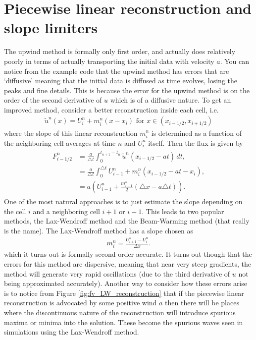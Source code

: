 \section*{Piecewise linear reconstruction and slope limiters}
The upwind method is formally only first order, and actually does relatively poorly in terms of actually transporting the initial data with velocity $a$.
You can notice from the example code that the upwind method has errors that are `diffusive' meaning that the initial data is diffused as time evolves, losing the peaks and fine details.
This is because the error for the upwind method is on the order of the second derivative of $u$ which is of a diffusive nature.
To get an improved method, consider a better reconstruction inside each cell, i.e.
\begin{gather}
\tilde{u}^n(x) = U_i^n + m_i^n(x-x_i) \mbox{ for } x \in (x_{i-1/2},x_{i+1/2})
\end{gather}
where the slope of this linear reconstruction $m_i^n$ is determined as a function of the neighboring cell averages at time $n$ and $U_i^n$ itself.
Then the flux is given by
\begin{align}
\begin{split}
F_{i-1/2}^n
&= \frac{a}{\triangle t}\int_{0}^{t_{n+1}-t_n} \tilde{u}^n(x_{i-1/2}-at)\, dt  ,\\
&= \frac{a}{\triangle t}\int_{0}^{\triangle t} U_{i-1}^n + m_i^n(x_{i-1/2} - at - x_i), \\
&= a \left( U_{i-1}^n + \frac{m_{i-1}^n}{2} (\triangle x - a \triangle t)\right).
\end{split}
\end{align}
One of the most natural approaches is to just estimate the slope depending on the cell $i$ and a neighboring cell $i+1$ or $i-1$.
This leads to two popular methods, the Lax-Wendroff method and the Beam-Warming method (that really is the name).
The Lax-Wendroff method has a slope chosen as
\begin{gather}
m_i^n = \frac{U^n_{i+1}-U_{i}^n}{\Delta x}.
\end{gather}
which it turns out is formally second-order accurate.
It turns out though that the errors for this method are dispersive, meaning that near very steep gradients, the method will generate very rapid oscillations (due to the third derivative of $u$ not being approximated accurately).
Another way to consider how these errors arise is to notice from Figure \ref{fig:fv_LW_reconstruction} that if the piecewise linear reconstruction is advocated by some positive wind $a$ then there will be places where the discontinuous nature of the reconstruction will introduce spurious maxima or minima into the solution.
These become the spurious waves seen in simulations using the Lax-Wendroff method.

